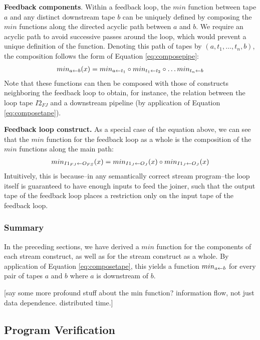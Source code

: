 {\bf Feedback components}.  Within a feedback loop, the $min$ function
between tape $a$ and any distinct downstream tape $b$ can be uniquely
defined by composing the $min$ functions along the directed acyclic
path between $a$ and $b$.  We require an acyclic path to avoid
successive passes around the loop, which would prevent a unique
definition of the function.  Denoting this path of tapes by $(a, t_1,
\dots , t_n, b)$, the composition follows the form of Equation
\ref{eq:composepipe}:
\begin{align*}
min_{a \leftarrow b}(x) = min_{a \leftarrow t_1} \circ min_{t_1 \leftarrow t_2} \circ \dots min_{t_n \leftarrow b}
\end{align*}
Note that these functions can then be composed with those of
constructs neighboring the feedback loop to obtain, for instance, the
relation between the loop tape $I2_{FJ}$ and a downstream pipeline (by
application of Equation \ref{eq:composetape}).

{\bf Feedback loop construct.}  As a special case of the equation
above, we can see that the $min$ function for the feedback loop as a
whole is the composition of the $min$ functions along the main path:
\begin{align*}
min_{I1_{FJ} \leftarrow O_{FS}}(x) = min_{I1_J \leftarrow O_J}(x) \circ min_{I1_J \leftarrow O_J}(x) 
\end{align*}
Intuitively, this is because--in any semantically correct stream
program--the loop itself is guaranteed to have enough inputs to feed
the joiner, such that the output tape of the feedback loop places a
restriction only on the input tape of the feedback loop.

\subsubsection{Summary}

In the preceding sections, we have derived a $min$ function for the
components of each stream construct, as well as for the stream
construct as a whole.  By application of Equation
\ref{eq:composetape}, this yields a function $min_{a \leftarrow b}$ for every
pair of tapes $a$ and $b$ where $a$ is downstream of $b$.

[say some more profound stuff about the min function?  information
  flow, not just data dependence.  distributed time.]

\subsection{Program Verification}

